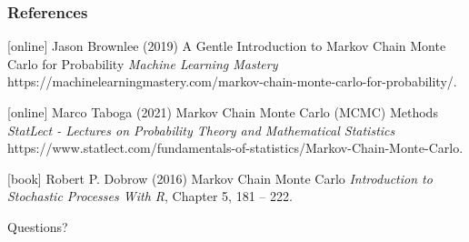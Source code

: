 \documentclass{beamer}
\newcommand{\<}				{\langle}
\renewcommand{\>}      		{\rangle}
\begin{document}
\begin{frame}
\frametitle{References}
\footnotesize{
\begin{thebibliography}{9} 

[online]
 Jason Brownlee (2019)
\newblock A Gentle Introduction to Markov Chain Monte Carlo for Probability
\newblock \emph{Machine Learning Mastery} https://machinelearningmastery.com/markov-chain-monte-carlo-for-probability/.

[online]
 Marco Taboga (2021)
\newblock Markov Chain Monte Carlo (MCMC) Methods
\newblock \emph{StatLect - Lectures on Probability Theory and Mathematical Statistics} https://www.statlect.com/fundamentals-of-statistics/Markov-Chain-Monte-Carlo.

[book]
 Robert P. Dobrow (2016)
\newblock Markov Chain Monte Carlo
\newblock \emph{Introduction to Stochastic Processes With R}, Chapter 5, 181 -- 222.

\end{thebibliography}
}
\end{frame}


\begin{frame}
\Huge{\centerline{Questions?}}
\end{frame}

\end{document}
